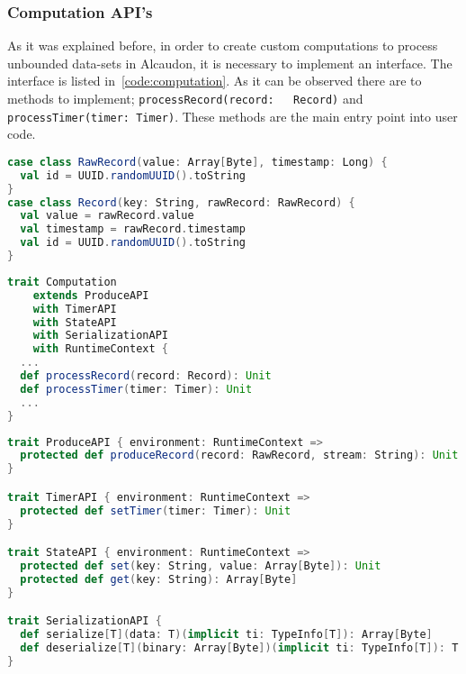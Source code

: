 \subsubsection{Computation API's}

As it was explained before, in order to create custom computations to process
unbounded data-sets in Alcaudon, it is necessary to implement an interface. The
interface is listed in~\ref{code:computation}. As it can be observed there are
to methods to implement; \lstinline[columns=fixed]{processRecord(record:
  Record)} and \lstinline[columns=fixed]{processTimer(timer: Timer)}. These methods
are the main entry point into user code.

\begin{lstlisting}[language=scala, frame=trBL, label=code:computation, float=ht, caption = {Computation API's}]
case class RawRecord(value: Array[Byte], timestamp: Long) {
  val id = UUID.randomUUID().toString
}
case class Record(key: String, rawRecord: RawRecord) {
  val value = rawRecord.value
  val timestamp = rawRecord.timestamp
  val id = UUID.randomUUID().toString
}
\end{lstlisting}


\begin{lstlisting}[language=scala, frame=trBL, label=code:computation, float=ht, caption = {Computation API's}]
trait Computation
    extends ProduceAPI
    with TimerAPI
    with StateAPI
    with SerializationAPI
    with RuntimeContext {
  ...
  def processRecord(record: Record): Unit
  def processTimer(timer: Timer): Unit
  ...
}
\end{lstlisting}

\begin{lstlisting}[language=scala, frame=trBL, label=code:auxiliarcomputation, float=ht, caption = {Auxiliary computation API's}]
trait ProduceAPI { environment: RuntimeContext =>
  protected def produceRecord(record: RawRecord, stream: String): Unit =
}

trait TimerAPI { environment: RuntimeContext =>
  protected def setTimer(timer: Timer): Unit
}

trait StateAPI { environment: RuntimeContext =>
  protected def set(key: String, value: Array[Byte]): Unit
  protected def get(key: String): Array[Byte]
}

trait SerializationAPI {
  def serialize[T](data: T)(implicit ti: TypeInfo[T]): Array[Byte]
  def deserialize[T](binary: Array[Byte])(implicit ti: TypeInfo[T]): T
}
\end{lstlisting}

